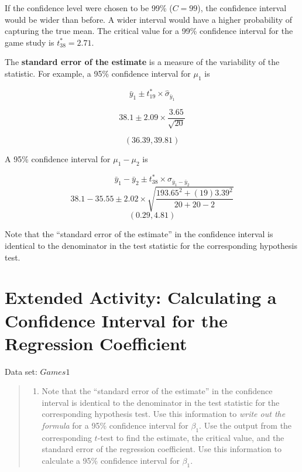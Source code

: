 \documentclass[
]{report}
\providecommand{\tightlist}{%
  \setlength{\itemsep}{0pt}\setlength{\parskip}{0pt}}
\begin{document}
If the confidence level were chosen to be 99\% (\(C = 99\)), the confidence interval would be wider than before. A wider interval would have a higher probability of capturing the true mean. The critical value for a 99\% confidence interval for the game study is \(t^*_{38} = 2.71\).

The \textbf{standard error of the estimate} is a measure of the variability of the statistic. For example, a 95\% confidence interval for \(\mu_1\) is

\[
\bar{y}_1 \pm t^*_{19} \times \hat{\sigma}_{\bar{y}_1}
\]

\[
38.1 \pm 2.09 \times \frac{3.65}{\sqrt{20}}
\]

\[
(36.39, 39.81)
\]

A 95\% confidence interval for \(\mu_1 - \mu_2\) is

\[
\bar{y}_1 - \bar{y}_2 \pm t^*_{38} \times \hat{\sigma}_{\bar{y}_1 - \bar{y}_2}
\]
\[
38.1 - 35.55 \pm 2.02 \times \sqrt{ \frac{193.65^2 + (19)3.39^2}{20 + 20 - 2} }
\]
\[
(0.29, 4.81)
\]

Note that the ``standard error of the estimate'' in the confidence interval is identical to the denominator in the test statistic for the corresponding hypothesis test.

\section*{Extended Activity: Calculating a Confidence Interval for the Regression Coefficient}\label{extended-activity-calculating-a-confidence-interval-for-the-regression-coefficient}

Data set: \(Games1\)

\begin{quote}
\begin{enumerate}
\def\labelenumi{\arabic{enumi}.}
\setcounter{enumi}{39}
\tightlist
\item
  Note that the ``standard error of the estimate'' in the confidence interval is identical to the denominator in the test statistic for the corresponding hypothesis test. Use this information to \emph{write out the formula} for a 95\% confidence interval for \(\beta_1\). Use the output from the corresponding \(t\)-test to find the estimate, the critical value, and the standard error of the regression coefficient. Use this information to calculate a 95\% confidence interval for \(\beta_1\).
\end{enumerate}
\end{quote}
\end{document}
